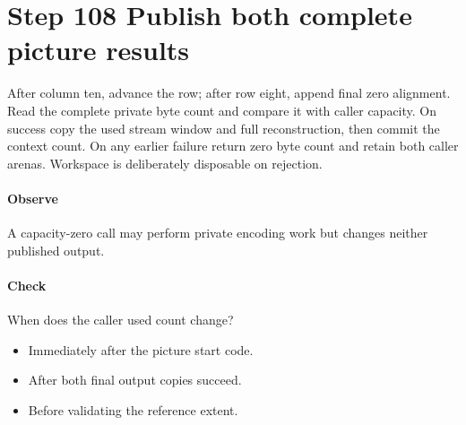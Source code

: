 \section{Step 108 Publish both complete picture results}\label{h263-picture-s08}
After column ten, advance the row; after row eight, append final zero alignment.
Read the complete private byte count and compare it with caller capacity. On
success copy the used stream window and full reconstruction, then commit the
context count. On any earlier failure return zero byte count and retain both
caller arenas. Workspace is deliberately disposable on rejection.

\paragraph{Observe} A capacity-zero call may perform private encoding work but changes neither published output.
\paragraph{Check} When does the caller used count change?
\begin{itemize}
  \item[A.] Immediately after the picture start code.
  \item[B.] After both final output copies succeed.
  \item[C.] Before validating the reference extent.
\end{itemize}
